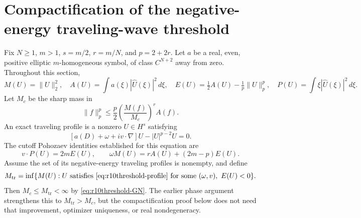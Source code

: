 \section{Compactification of the negative-energy traveling-wave threshold}
\label{sec:r10-threshold}

Fix $N\ge1$, $m>1$, $s=m/2$, $r=m/N$, and $p=2+2r$. Let
$a$ be a real, even, positive elliptic $m$-homogeneous symbol, of class
$C^{N+2}$ away from zero. Throughout this section,
\[
 M(U)=\|U\|_2^2,\quad A(U)=\int a(\xi)|\widehat U(\xi)|^2\,d\xi,
 \quad E(U)=\tfrac12A(U)-\tfrac1p\|U\|_p^p,
 \quad P(U)=\int\xi|\widehat U(\xi)|^2\,d\xi.
\]
Let $M_c$ be the sharp mass in
\begin{equation}\label{eq:r10threshold-GN}
 \|f\|_p^p\le \frac p2\left(\frac{M(f)}{M_c}\right)^r A(f).
\end{equation}
An exact traveling profile is a nonzero $U\in H^s$ satisfying
\begin{equation}\label{eq:r10threshold-profile}
 [a(D)+\omega+iv\cdot\nabla]U-|U|^{p-2}U=0.
\end{equation}
The cutoff Pohozaev identities established for this equation are
\begin{equation}\label{eq:r10threshold-pohoz}
 v\cdot P(U)=2mE(U),\qquad
 \omega M(U)=rA(U)+(2m-p)E(U).
\end{equation}
Assume the set of its negative-energy traveling profiles is nonempty,
and define
\[
 M_{\mathrm{tr}}=\inf\{M(U):U\text{ satisfies }
 \eqref{eq:r10threshold-profile}\text{ for some }(\omega,v),\ E(U)<0\}.
\]
Then $M_c\le M_{\mathrm{tr}}<\infty$ by
\eqref{eq:r10threshold-GN}. The earlier phase argument strengthens this
to $M_{\mathrm{tr}}>M_c$, but the compactification proof below does not
need that improvement, optimizer uniqueness, or real nondegeneracy.

